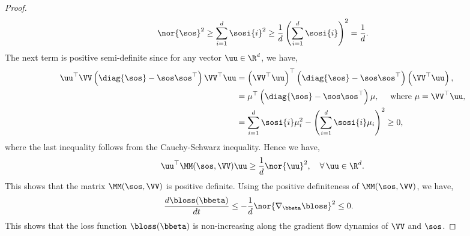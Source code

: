 \documentclass{article}
\theoremstyle{plain}
\theoremstyle{definition}
\theoremstyle{remark}
\begin{document}
\begin{proof}
\begin{align*}
        \nor{\sos}^2  \geq \sum_{i=1}^{d} \sosi{i}^2 \geq \frac{1}{d} \left( \sum_{i=1}^{d} \sosi{i} \right)^2 = \frac{1}{d}.
    \end{align*}
    The next term is positive semi-definite since for any vector $\uu \in \R^{d}$, we have,
    \begin{align*}
        \uu^{\top} \VV \left( \diag{\sos} - \sos \sos^{\top} \right) \VV^{\top} \uu &= \left( \VV^{\top} \uu \right)^{\top} \left( \diag{\sos} - \sos \sos^{\top} \right) \left( \VV^{\top} \uu \right), \\
        &= \mu^{\top} \left( \diag{\sos} - \sos \sos^{\top} \right) \mu, \quad \text{ where } \mu = \VV^{\top} \uu, \\
        &= \sum_{i=1}^{d} \sosi{i} \mu_i^2 - \left( \sum_{i=1}^{d} \sosi{i} \mu_i \right)^2 \geq 0,
    \end{align*}
    where the last inequality follows from the Cauchy-Schwarz inequality. Hence we have,
    \begin{align*}
        \uu^{\top} \MM(\sos, \VV) \uu \geq \frac{1}{d} \nor{\uu}^2, \quad \forall \, \uu \in \R^{d}.
    \end{align*}
    This shows that the matrix $\MM(\sos, \VV)$ is positive definite. Using the positive definiteness of $\MM(\sos, \VV)$, we have,
    \begin{align*}
        \frac{d \bloss(\bbeta)}{dt} &\leq - \frac{1}{d} \nor{\nabla_{\bbeta} \bloss}^2 \leq 0.
    \end{align*}
    This shows that the loss function $\bloss(\bbeta)$ is non-increasing along the gradient flow dynamics of $\VV$ and $\sos$.
\end{proof}
\end{document}
